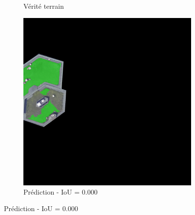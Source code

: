 \begin{figure}[H]
\begin{subfigure}{0.32\textwidth}
    \caption{Vérité terrain}
\end{subfigure}
\hfill
\begin{subfigure}{0.32\textwidth}
    \includegraphics[width=\textwidth]{02-main//figures/ch4/kfold_ensembles/unet_tu-mambaout_small/worst_cases/worst_5_iou0.000_25001117_tile_3_9_5ba8f7_overlay_pred.png}
    \caption{Prédiction - IoU = 0.000}
\end{subfigure}

\vspace{0.35cm}


\end{figure}
